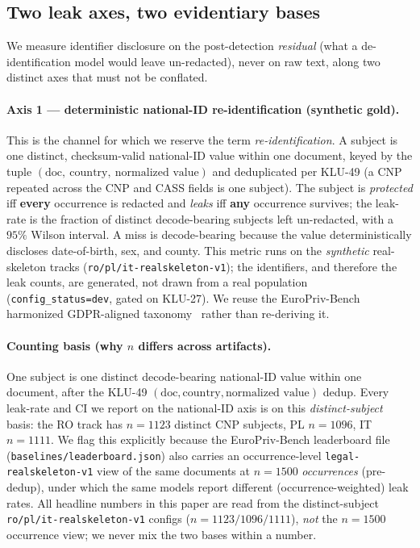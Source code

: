 \documentclass[11pt]{article}
\begin{document}
\subsection{Two leak axes, two evidentiary bases}
\label{subsec:two-axes}
We measure identifier disclosure on the post-detection \emph{residual} (what a
de-identification model would leave un-redacted), never on raw text, along two distinct
axes that must not be conflated.

\paragraph{Axis 1 --- deterministic national-ID re-identification (synthetic gold).}
This is the channel for which we reserve the term \emph{re-identification}. A subject is one
distinct, checksum-valid national-ID value within one document, keyed by the tuple
$(\text{doc},\ \text{country},\ \text{normalized value})$ and deduplicated per KLU-49 (a CNP repeated
across the CNP and CASS fields is one subject). The subject is \emph{protected} iff \textbf{every}
occurrence is redacted and \emph{leaks} iff \textbf{any} occurrence survives; the leak-rate is the
fraction of distinct decode-bearing subjects left un-redacted, with a $95\%$ Wilson interval. A miss
is decode-bearing because the value deterministically discloses date-of-birth, sex, and county. This
metric runs on the \emph{synthetic} real-skeleton tracks (\texttt{ro/pl/it-realskeleton-v1}); the
identifiers, and therefore the leak counts, are generated, not drawn from a real population
(\texttt{config\_status=dev}, gated on KLU-27). We reuse the EuroPriv-Bench harmonized GDPR-aligned
taxonomy~\cite{europrivbench2026} rather than re-deriving it.

\paragraph{Counting basis (why $n$ differs across artifacts).}
One subject is one distinct decode-bearing national-ID value within one document, after the KLU-49
$(\text{doc},\text{country},\text{normalized value})$ dedup. Every leak-rate and CI we report on the
national-ID axis is on this \emph{distinct-subject} basis: the RO track has $n{=}1123$ distinct CNP
subjects, PL $n{=}1096$, IT $n{=}1111$. We flag this explicitly because the EuroPriv-Bench leaderboard
file (\texttt{baselines/leaderboard.json}) also carries an occurrence-level \texttt{legal-realskeleton-v1}
view of the same documents at $n{=}1500$ \emph{occurrences} (pre-dedup), under which the same models
report different (occurrence-weighted) leak rates. All headline numbers in this paper are read from the
distinct-subject \texttt{ro/pl/it-realskeleton-v1} configs ($n{=}1123/1096/1111$), \emph{not} the
$n{=}1500$ occurrence view; we never mix the two bases within a number.
\end{document}
